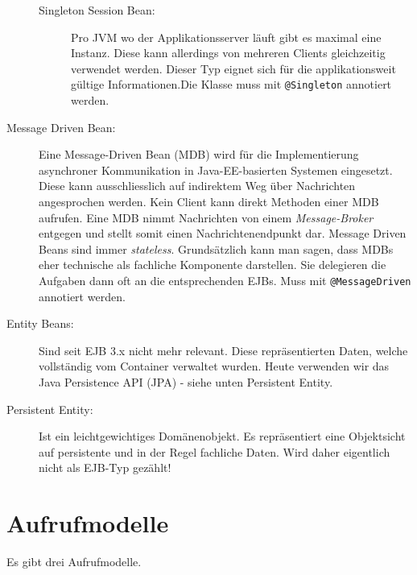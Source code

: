 \begin{description}
\begin{description}
			\item[Singleton Session Bean:] Pro JVM wo der Applikationsserver läuft gibt es maximal eine Instanz. Diese kann allerdings von mehreren Clients gleichzeitig verwendet werden. Dieser Typ eignet sich für die applikationsweit gültige Informationen.Die Klasse muss mit \verb|@Singleton| annotiert werden.
		\end{description}
	
	\item[Message Driven Bean:] Eine Message-Driven Bean (MDB) wird für die Implementierung asynchroner Kommunikation in Java-EE-basierten Systemen eingesetzt. Diese kann ausschliesslich auf indirektem Weg über Nachrichten angesprochen werden. Kein Client kann direkt Methoden einer MDB aufrufen. Eine MDB nimmt Nachrichten von einem \emph{Message-Broker} entgegen und stellt somit einen Nachrichtenendpunkt dar. Message Driven Beans sind immer \emph{stateless}. Grundsätzlich kann man sagen, dass MDBs eher technische als fachliche Komponente darstellen. Sie delegieren die Aufgaben dann oft an die entsprechenden EJBs. Muss mit \verb|@MessageDriven| annotiert werden.
	
	\item[Entity Beans:] Sind seit EJB 3.x nicht mehr relevant. Diese repräsentierten Daten, welche vollständig vom Container verwaltet wurden. Heute verwenden wir das Java Persistence API (JPA) - siehe unten Persistent Entity.
		
	\item[Persistent Entity:] Ist ein leichtgewichtiges Domänenobjekt. Es repräsentiert eine Objektsicht auf persistente und in der Regel fachliche Daten. Wird daher eigentlich nicht als EJB-Typ gezählt!
\end{description}

\section{Aufrufmodelle}
Es gibt drei Aufrufmodelle.

